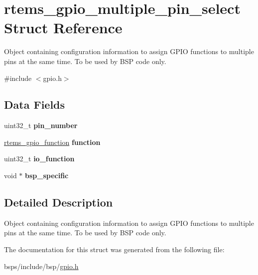 \hypertarget{structrtems__gpio__multiple__pin__select}{}\section{rtems\+\_\+gpio\+\_\+multiple\+\_\+pin\+\_\+select Struct Reference}
\label{structrtems__gpio__multiple__pin__select}


Object containing configuration information to assign G\+P\+IO functions to multiple pins at the same time. To be used by B\+SP code only.  




{\ttfamily \#include $<$gpio.\+h$>$}

\subsection*{Data Fields}
\begin{DoxyCompactItemize}
\item 
\mbox{\label{structrtems__gpio__multiple__pin__select_ac1489a01bdd619cbe68fc5631c91877f}} 
uint32\+\_\+t {\bfseries pin\+\_\+number}
\item 
\mbox{\label{structrtems__gpio__multiple__pin__select_a912a917aac9e6e83dc6d8e5d2dd1523f}} 
\mbox{\hyperlink{gpio_8h_a0dec0f66d467b092b41dafe3d731a0d1}{rtems\+\_\+gpio\+\_\+function}} {\bfseries function}
\item 
\mbox{\label{structrtems__gpio__multiple__pin__select_ac852cba04e2616c2d7f5751c67c1ea96}} 
uint32\+\_\+t {\bfseries io\+\_\+function}
\item 
\mbox{\label{structrtems__gpio__multiple__pin__select_a62d898593b7fe0a935c2a4b4b27ee1fe}} 
void $\ast$ {\bfseries bsp\+\_\+specific}
\end{DoxyCompactItemize}


\subsection{Detailed Description}
Object containing configuration information to assign G\+P\+IO functions to multiple pins at the same time. To be used by B\+SP code only. 

The documentation for this struct was generated from the following file\+:\begin{DoxyCompactItemize}
\item 
bsps/include/bsp/\mbox{\hyperlink{gpio_8h}{gpio.\+h}}\end{DoxyCompactItemize}

